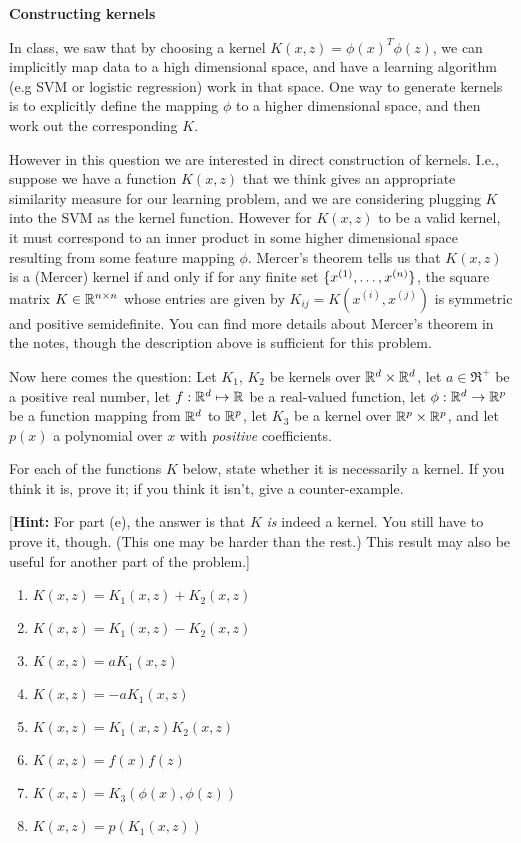 \item {\bf Constructing kernels}

In class, we saw that by choosing a kernel $K(x,z) = \phi(x)^T\phi(z)$, we can
implicitly map data to a high dimensional space, and have a learning algorithm (e.g SVM or logistic regression)
work in that space. One way to generate kernels is to explicitly define the
mapping $\phi$ to a higher dimensional space, and then work out the
corresponding $K$.

However in this question we are interested in direct construction of kernels.
I.e., suppose we have a function $K(x,z)$ that we think gives an appropriate
similarity measure for our learning problem, and we are considering plugging
$K$ into the SVM as the kernel function. However for $K(x,z)$ to be a valid
kernel, it must correspond to an inner product in some higher dimensional space
resulting from some feature mapping $\phi$.  Mercer's theorem tells us that
$K(x,z)$ is a (Mercer) kernel if and only if for any finite set $\{x^{(1)},
\ldots, x^{({n})}\}$, the square matrix $K \in {\mathbb R}^{{n} \times {n}}$ whose entries
are given by $K_{ij} = K(x^{(i)},x^{(j)})$ is symmetric and positive
semidefinite. You can find more details about Mercer's theorem in the notes,
though the description above is sufficient for this problem.

Now here comes the question: Let $K_1$, $K_2$ be kernels over ${\mathbb R}^{{d}} \times
{\mathbb R}^{{d}}$, let $a \in \Re^+$ be a positive real number, let $f : {\mathbb R}^{{d}} \mapsto
{\mathbb R}$ be a real-valued function, let $\phi: {\mathbb R}^{{d}} \rightarrow {\mathbb R}^{p}$ be a
function mapping from ${\mathbb R}^{{d}}$ to ${\mathbb R}^{p}$, let $K_3$ be a kernel over ${\mathbb R}^{p}
\times {\mathbb R}^{p}$, and let $p(x)$ a polynomial over $x$ with \emph{positive}
coefficients.

For each of the functions $K$ below, state whether it is necessarily a
kernel.  If you think it is, prove it; if you think it isn't, give a
counter-example.

[\textbf{Hint:} For part (e), the answer is that $K$ \emph{is} indeed
a kernel. You still have to prove it, though.  (This one may be harder than the
rest.)  This result may also be useful for another part of the problem.]

\begin{enumerate}

\item {} $K(x,z) = K_1(x,z) + K_2(x,z)$
\item {} $K(x,z) = K_1(x,z) - K_2(x,z)$
\item {} $K(x,z) = a K_1(x,z)$
\item {} $K(x,z) = -a K_1(x,z)$
\item {} $K(x,z) = K_1(x,z)K_2(x,z)$
\item {} $K(x,z) = f(x)f(z)$
\item {} $K(x,z) = K_3(\phi(x),\phi(z))$
\item {} $K(x,z) = p(K_1(x,z))$

\end{enumerate}
